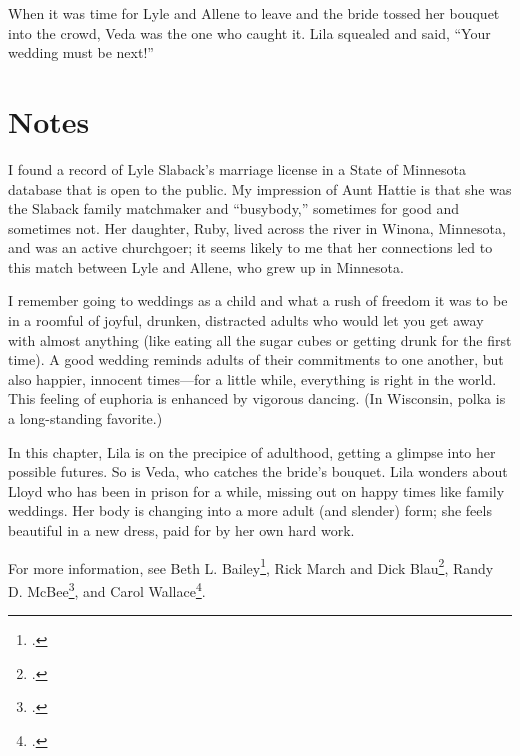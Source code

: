 \documentclass[
  letterpaper,
]{book}
\begin{document}
When it was time for Lyle and Allene to leave and the bride tossed her
bouquet into the crowd, Veda was the one who caught it. Lila squealed
and said, ``Your wedding must be next!''

\section{Notes}\label{notes-21}

I found a record of Lyle Slaback's marriage license in a State of
Minnesota database that is open to the public. My impression of Aunt
Hattie is that she was the Slaback family matchmaker and ``busybody,''
sometimes for good and sometimes not. Her daughter, Ruby, lived across
the river in Winona, Minnesota, and was an active churchgoer; it seems
likely to me that her connections led to this match between Lyle and
Allene, who grew up in Minnesota.

I remember going to weddings as a child and what a rush of freedom it
was to be in a roomful of joyful, drunken, distracted adults who would
let you get away with almost anything (like eating all the sugar cubes
or getting drunk for the first time). A good wedding reminds adults of
their commitments to one another, but also happier, innocent times---for
a little while, everything is right in the world. This feeling of
euphoria is enhanced by vigorous dancing. (In Wisconsin, polka is a
long-standing favorite.)

In this chapter, Lila is on the precipice of adulthood, getting a
glimpse into her possible futures. So is Veda, who catches the bride's
bouquet. Lila wonders about Lloyd who has been in prison for a while,
missing out on happy times like family weddings. Her body is changing
into a more adult (and slender) form; she feels beautiful in a new
dress, paid for by her own hard work.

For more information, see Beth L. Bailey\footnote{.}, Rick March and
Dick Blau\footnote{.}, Randy D. McBee\footnote{.}, and
Carol Wallace\footnote{.}.
\end{document}
